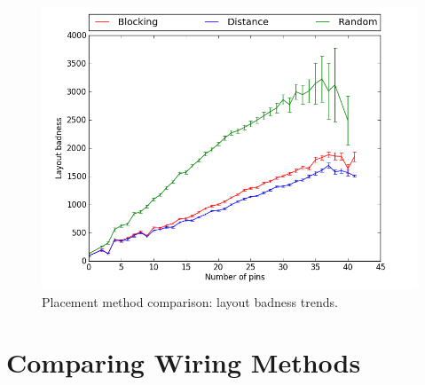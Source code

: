 \begin{figure}
\begin{center}
\includegraphics[width=\textwidth]{Images/placement_badness_trend_comparison.png}
\caption{Placement method comparison: layout badness trends.}
\label{fig:placement_badness_trend}
\end{center}
\end{figure}

\section{Comparing Wiring Methods}

